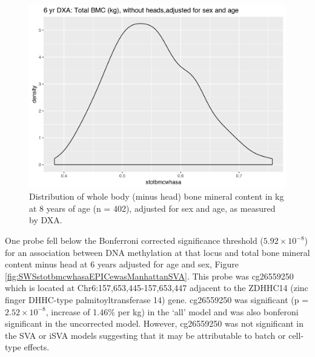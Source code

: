 \documentclass[
]{book}
\begin{document}
\begin{figure}

{\centering \includegraphics[width=0.8\linewidth]{figs/SWS6yrBMCdist} 

}

\caption{Distribution of whole body (minus head) bone mineral content in kg at 8 years of age (n = 402), adjusted for sex and age, as measured by DXA.}\label{fig:SWSstotbmcwhasa}
\end{figure}



One probe fell below the Bonferroni corrected significance threshold (\(5.92\times10^{-8}\)) for an association between DNA methylation at that locus and total bone mineral content minus head at 6 years adjusted for age and sex, Figure \ref{fig:SWSstotbmcwhasaEPICewasManhattanSVA}. This probe was cg26559250 which is located at Chr6:157,653,445-157,653,447 adjacent to the ZDHHC14 (zinc finger DHHC-type palmitoyltransferase 14) gene. cg26559250 was significant (p = \(2.52\times 10^{-8}\), increase of 1.46\% per kg) in the `all' model and was also bonferoni significant in the uncorrected model. However, cg26559250 was not significant in the SVA or iSVA models suggesting that it may be attributable to batch or cell-type effects.
\end{document}
